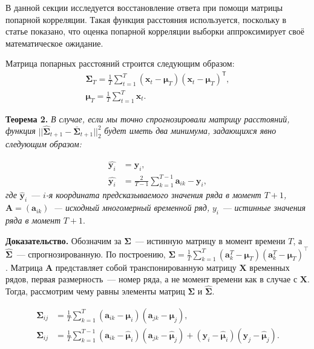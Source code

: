 \documentclass{article}
\begin{document}
В данной секции исследуется восстановление ответа при помощи матрицы попарной корреляции. Такая функция расстояния используется, поскольку в статье \cite{puchkin2023sharper} показано, что оценка попарной корреляции выборки аппроксимирует своё математическое ожидание.

Матрица попарных расстояний строится следующим образом:
\begin{gather*}
	{\mathbf{\Sigma}}_T = \frac{1}{T} \sum_{t=1}^{T} (\mathbf{x}_t - \boldsymbol{\mu}_T)(\mathbf{x}_t - \boldsymbol{\mu}_T)^\mathsf{T},\\
	\boldsymbol{\mu}_T = \frac{1}{T} \sum_{t=1}^{T} \mathbf{x}_t.
\end{gather*}

\textbf{Теорема 2.} \textit{В случае, если мы точно спрогнозировали матрицу расстояний, функция} $||\hat{\mathbf{\Sigma}}_{t+1} - \bar{\mathbf{\Sigma}}_{t+1}||_2^2$ \textit{будет иметь два минимума, задающихся явно следующим образом:}

\begin{align*}
	\hat{\mathbf{y}_i} &= \mathbf{y}_i,\\
	\hat{\mathbf{y}_i} &= \frac{2}{T-1} \sum_{k=1}^{T-1} \mathbf{a}_{ik} - \mathbf{y}_i,
\end{align*}
\textit{где} $\hat{\mathbf{y}}_i$~--- $i$\textit{-я координата предсказываемого значения ряда в момент $T+1$, $\mathbf{A}=(\mathbf{a}_{ik})$~--- исходный многомерный временной ряд,} $y_i$~--- \textit{истинные значения ряда в момент} $T+1$.

\textbf{Доказательство.} Обозначим за $\mathbf{\Sigma}$~--- истинную матрицу в момент времени $T$, а $\hat{\mathbf{\Sigma}}$~--- спрогнозированную. По построению, ${\mathbf{\Sigma}} = \frac{1}{T} \sum_{k=1}^{T} (\mathbf{a}^T_k - \boldsymbol{\mu}_T)(\mathbf{a}^T_k - \boldsymbol{\mu}_T)^\intercal\texttt{}$. Матрица $\mathbf{A}$ представляет собой транспонированную матрицу $\mathbf{X}$ временных рядов, первая размерность~--- номер ряда, а не момент времени как в случае с $\mathbf{X}$. Тогда, рассмотрим чему равны элементы матриц $\mathbf{\Sigma}$ и $\hat{\mathbf{\Sigma}}$.

\begin{align*}
	\mathbf{\Sigma}_{ij} &= \frac{1}{T}\sum_{k=1}^{T}(\mathbf{a}_{ik} - \boldsymbol{\mu}_i)(\mathbf{a}_{jk}-\boldsymbol{\mu}_j),\\
	\hat{\mathbf{\Sigma}}_{ij} &= \frac{1}{T}\sum_{k=1}^{T-1}(\mathbf{a}_{ik} - \hat{\boldsymbol{\mu}}_i)(\mathbf{a}_{jk}-\hat{\boldsymbol{\mu}}_j) + (\mathbf{y}_i - \hat{\boldsymbol{\mu}}_i)(\mathbf{y}_j - \hat{\boldsymbol{\mu}}_j).
\end{align*}
\end{document}
